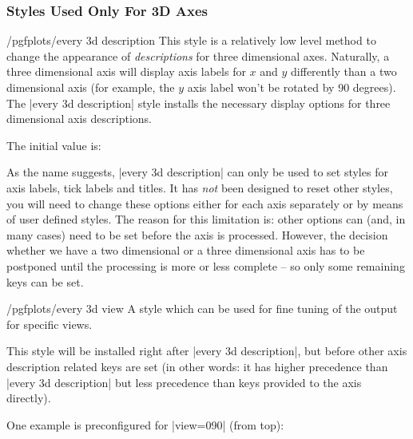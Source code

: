 \subsubsection{Styles Used Only For 3D Axes}
\begin{stylekey}{/pgfplots/every 3d description}
	This style is a relatively low level method to change the appearance of \emph{descriptions} for three dimensional axes. Naturally, a three dimensional axis will display axis labels for $x$ and $y$ differently  than a two dimensional axis (for example, the $y$ axis label won't be rotated by 90 degrees). The |every 3d description| style installs the necessary display options for three dimensional axis descriptions.

	The initial value is:
\begin{codeexample}
\end{codeexample}

	As the name suggests, |every 3d description| can only be used to set styles for axis labels, tick labels and titles. It has \emph{not} been designed to reset other styles, you will need to change these options either for each axis separately or by means of user defined styles. The reason for this limitation is: other options can (and, in many cases) need to be set before the axis is processed. However, the decision whether we have a two dimensional or a three dimensional axis has to be postponed until the processing is more or less complete -- so only some remaining keys can be set.	
\end{stylekey}

\begin{stylekey}{/pgfplots/every 3d view }
	A style which can be used for fine tuning of the output for specific views.

	This style will be installed right after |every 3d description|, but before other axis description related keys are set (in other words: it has higher precedence than |every 3d description| but less precedence than keys provided to the axis directly).

	One example is preconfigured for |view={0}{90}| (from top):
\begin{codeexample}
\end{codeexample}
\end{stylekey}


